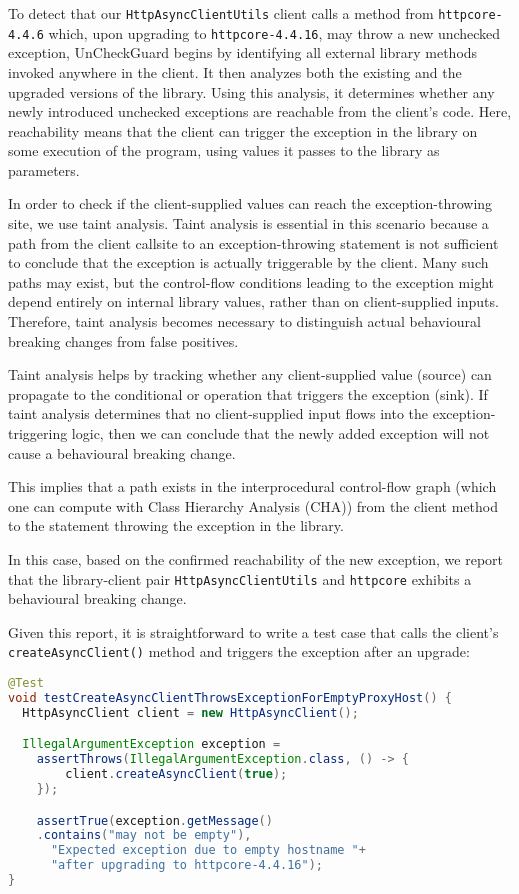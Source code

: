 To detect that our \texttt{HttpAsyncClientUtils} client calls a method from \texttt{httpcore-4.4.6} which, upon upgrading to \texttt{httpcore-4.4.16}, may throw a new unchecked exception, UnCheckGuard begins by identifying all external library methods invoked anywhere in the client. It then analyzes both the existing and the upgraded versions of the library. Using this analysis, it determines whether any newly introduced unchecked exceptions are reachable from the client's code. Here, reachability means that the client can trigger the exception in the library on some execution of the program, using values it passes to the library as parameters.

In order to check if the client-supplied values can reach the exception-throwing site, we use taint analysis. Taint analysis is essential in this scenario because a path from the client callsite to an exception-throwing statement is not sufficient to conclude that the exception is actually triggerable by the client. Many such paths may exist, but the control-flow conditions leading to the exception might depend entirely on internal library values, rather than on client-supplied inputs. Therefore, taint analysis becomes necessary to distinguish actual behavioural breaking changes from false positives.

Taint analysis helps by tracking whether any client-supplied value (source) can propagate to the conditional or operation that triggers the exception (sink). If taint analysis determines that no client-supplied input flows into the exception-triggering logic, then we can conclude that the newly added exception will not cause a behavioural breaking change.

This implies that a path exists in the interprocedural control-flow graph (which one can compute with Class Hierarchy Analysis (CHA)) from the client method to the statement throwing the exception in the library.

In this case, based on the confirmed reachability of the new exception, we report that the library-client pair \texttt{HttpAsyncClientUtils} and \texttt{httpcore} exhibits a behavioural breaking change.

Given this report, it is straightforward to write a test case that calls the client's \texttt{createAsyncClient()} method
and triggers the exception after an upgrade:
\begin{lstlisting}[language=Java,basicstyle=\scriptsize\ttfamily]
@Test
void testCreateAsyncClientThrowsExceptionForEmptyProxyHost() {
  HttpAsyncClient client = new HttpAsyncClient();

  IllegalArgumentException exception =
    assertThrows(IllegalArgumentException.class, () -> {
        client.createAsyncClient(true);
    });

    assertTrue(exception.getMessage()
    .contains("may not be empty"),
      "Expected exception due to empty hostname "+
      "after upgrading to httpcore-4.4.16");
}
\end{lstlisting}